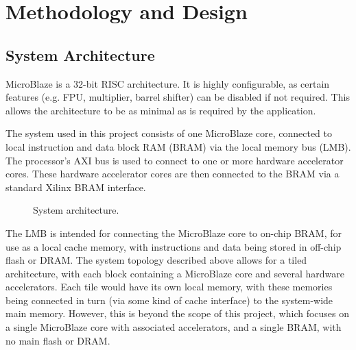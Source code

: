 \documentclass{UoYCSproject}
\begin{document}
\chapter{Methodology and Design}

\section{System Architecture}

MicroBlaze \cite{microblaze} is a 32-bit RISC architecture. It is highly configurable, as certain features
(e.g. FPU, multiplier, barrel shifter) can be disabled if not required. This allows the architecture to be as minimal as is
required by the application.

The system used in this project consists of one MicroBlaze core, connected to local instruction and data block RAM (BRAM)
via the local memory bus (LMB). The processor's AXI bus is used to connect to one or more hardware accelerator cores.
These hardware accelerator cores are then connected to the BRAM via a standard Xilinx BRAM interface.

\begin{figure}[h]
\caption{System architecture.}
\label{fig:systemArchitecture}
\end{figure}

The LMB is intended for connecting the MicroBlaze core to on-chip BRAM, for use as a local cache memory, with instructions
and data being stored in off-chip flash or DRAM. The system topology described above allows for a tiled architecture,
with each block containing a MicroBlaze core and several hardware accelerators. Each tile would have its own local memory,
with these memories being connected in turn (via some kind of cache interface) to the system-wide main memory. However,
this is beyond the scope of this project, which focuses on a single MicroBlaze core with associated accelerators,
and a single BRAM, with no main flash or DRAM.
\end{document}
